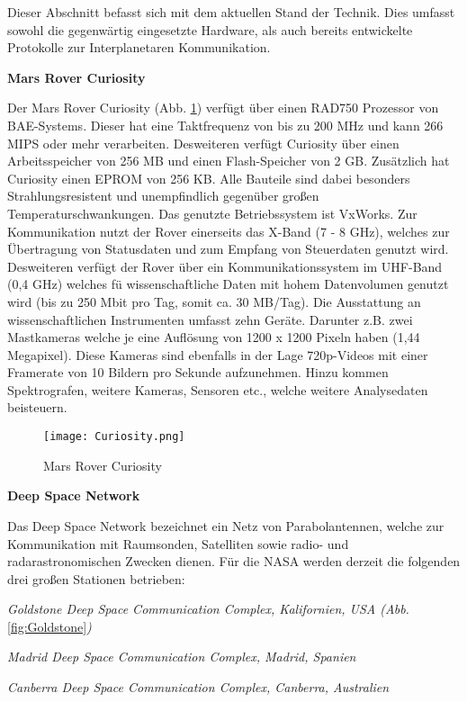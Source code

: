 Dieser Abschnitt befasst sich mit dem aktuellen Stand der Technik. Dies umfasst
sowohl die gegenw{\"a}rtig eingesetzte Hardware, als auch bereits
entwickelte Protokolle zur Interplanetaren Kommunikation.


\textbf{Mars Rover Curiosity}

Der Mars Rover Curiosity (Abb. \ref{fig:Curiosity}) verf{\"u}gt {\"u}ber einen
RAD750 Prozessor von BAE-Systems.
Dieser hat eine Taktfrequenz von bis zu 200 MHz und kann 266 MIPS oder mehr
verarbeiten. Desweiteren verf{\"u}gt Curiosity {\"u}ber einen Arbeitsspeicher von 256 MB
und einen Flash-Speicher von 2 GB. Zus{\"a}tzlich hat Curiosity einen EPROM von 256
KB. Alle Bauteile sind dabei besonders Strahlungsresistent und unempfindlich
gegen{\"u}ber gro{\ss}en Temperaturschwankungen. Das genutzte Betriebssystem ist
VxWorks. Zur Kommunikation nutzt der Rover
einerseits das X-Band (7 - 8 GHz), welches zur {\"U}bertragung von Statusdaten
und zum Empfang von Steuerdaten genutzt wird. Desweiteren verf{\"u}gt der Rover
{\"u}ber ein Kommunikationssystem im UHF-Band (0,4 GHz) welches f{\"u}
wissenschaftliche Daten mit hohem Datenvolumen genutzt wird (bis zu 250 Mbit
pro Tag, somit ca. 30 MB/Tag). Die Ausstattung an wissenschaftlichen
Instrumenten umfasst zehn Ger{\"a}te. Darunter z.B. zwei Mastkameras welche je
eine Aufl{\"o}sung von 1200 x 1200 Pixeln haben (1,44 Megapixel). Diese Kameras
sind ebenfalls in der Lage 720p-Videos mit einer Framerate von 10 Bildern pro
Sekunde aufzunehmen. Hinzu kommen Spektrografen, weitere Kameras, Sensoren etc.,
welche weitere Analysedaten beisteuern.

\begin{figure}[H]
\centering
\texttt{[image: Curiosity.png]}
\caption{Mars Rover Curiosity}
\label{fig:Curiosity}
\end{figure}

\textbf{Deep Space Network}

Das Deep Space Network bezeichnet ein Netz von Parabolantennen, welche zur
Kommunikation mit Raumsonden, Satelliten sowie radio-
und radarastronomischen Zwecken dienen. F{\"u}r die NASA werden derzeit die
folgenden drei gro{\ss}en Stationen betrieben:

\begin{compactenum}[a)]
\item \textit{Goldstone Deep Space Communication Complex, Kalifornien, USA
(Abb.} \ref{fig:Goldstone}\textit{)}
\item \textit{Madrid Deep Space Communication Complex, Madrid, Spanien}
\item \textit{Canberra Deep Space Communication Complex, Canberra, Australien}
\end{compactenum}

